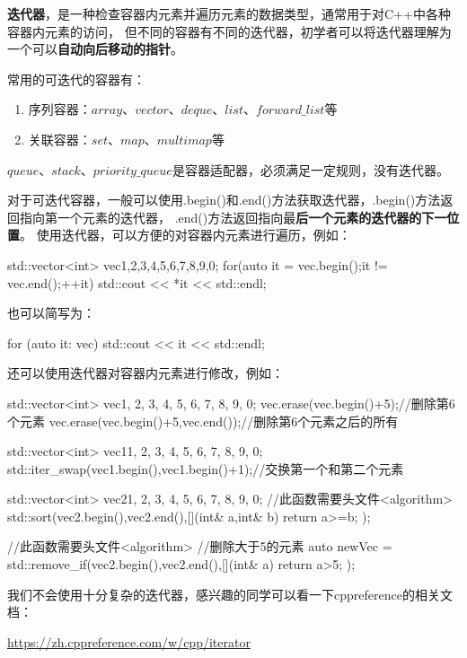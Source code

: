 
\textbf{迭代器}，是一种检查容器内元素并遍历元素的数据类型，通常用于对C++中各种容器内元素的访问，
但不同的容器有不同的迭代器，初学者可以将迭代器理解为一个可以\textbf{自动向后移动的指针}。

常用的可迭代的容器有：

\begin{enumerate}
    \item 序列容器：$array$、$vector$、$deque$、$list$、$forward\_list$等
    \item 关联容器：$set$、$map$、$multimap$等
\end{enumerate}

$queue$、$stack$、$priority\_queue$是容器适配器，必须满足一定规则，没有迭代器。

对于可迭代容器，一般可以使用.begin()和.end()方法获取迭代器，.begin()方法返回指向第一个元素的迭代器，
.end()方法返回指向最\textbf{后一个元素的迭代器的下一位置}。
使用迭代器，可以方便的对容器内元素进行遍历，例如：

\begin{tcode}
std::vector<int> vec{1,2,3,4,5,6,7,8,9,0};
for(auto it = vec.begin();it != vec.end();++it){
    std::cout << *it << std::endl;
}
\end{tcode}

也可以简写为：

\begin{tcode}
for (auto it: vec) {
    std::cout << it << std::endl;
}
\end{tcode}

还可以使用迭代器对容器内元素进行修改，例如：

\begin{tcode}
std::vector<int> vec{1, 2, 3, 4, 5, 6, 7, 8, 9, 0};
vec.erase(vec.begin()+5);//删除第6个元素
vec.erase(vec.begin()+5,vec.end());//删除第6个元素之后的所有

std::vector<int> vec1{1, 2, 3, 4, 5, 6, 7, 8, 9, 0};
std::iter_swap(vec1.begin(),vec1.begin()+1);//交换第一个和第二个元素

std::vector<int> vec2{1, 2, 3, 4, 5, 6, 7, 8, 9, 0};
//此函数需要头文件<algorithm>
std::sort(vec2.begin(),vec2.end(),[](int& a,int& b){
    return a>=b;
});

//此函数需要头文件<algorithm>
//删除大于5的元素
auto newVec = std::remove_if(vec2.begin(),vec2.end(),[](int& a){
    return a>5;
});
\end{tcode}

我们不会使用十分复杂的迭代器，感兴趣的同学可以看一下cppreference的相关文档：

\url{https://zh.cppreference.com/w/cpp/iterator}

